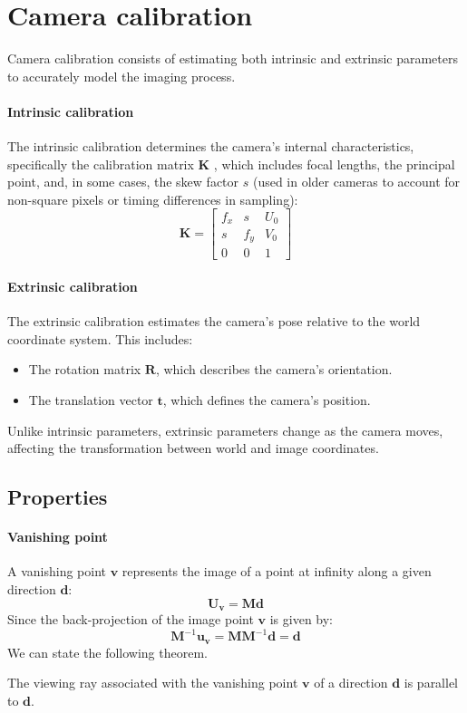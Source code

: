 \section{Camera calibration}

Camera calibration consists of estimating both intrinsic and extrinsic parameters to accurately model the imaging process.

\paragraph*{Intrinsic calibration}
The intrinsic calibration determines the camera's internal characteristics, specifically the calibration matrix $\mathbf{K}$ , which includes focal lengths, the principal point, and, in some cases, the skew factor $s$ (used in older cameras to account for non-square pixels or timing differences in sampling):
\[\mathbf{K}=\begin{bmatrix} f_x & s & U_0 \\ s & f_y & V_0 \\ 0 & 0 & 1 \end{bmatrix}\]

\paragraph*{Extrinsic calibration}
The extrinsic calibration estimates the camera's pose relative to the world coordinate system. 
This includes: 
\begin{itemize}
    \item The rotation matrix $\mathbf{R}$, which describes the camera's orientation.
    \item The translation vector $\mathbf{t}$, which defines the camera's position.
\end{itemize}
Unlike intrinsic parameters, extrinsic parameters change as the camera moves, affecting the transformation between world and image coordinates.

\subsection{Properties}
\paragraph*{Vanishing point}
A vanishing point $\mathbf{v}$ represents the image of a point at infinity along a given direction $\mathbf{d}$: 
\[\mathbf{U}_\mathbf{v}=\mathbf{Md}\]
Since the back-projection of the image point $\mathbf{v}$ is given by:
\[\mathbf{M}^{-1}\mathbf{u}_\mathbf{v}=\mathbf{MM}^{-1}\mathbf{d}=\mathbf{d}\] 
We can state the following theorem. 
\begin{theorem}
    The viewing ray associated with the vanishing point $\mathbf{v}$ of a direction $\mathbf{d}$ is parallel to $\mathbf{d}$.
\end{theorem}

